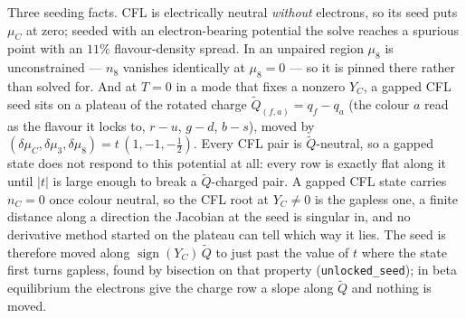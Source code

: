\documentclass[aps,prc,onecolumn,superscriptaddress,nofootinbib,10pt]{revtex4-2}
\newcommand{\muC}{\mu_C}
\begin{document}
Three seeding facts. CFL is electrically neutral \emph{without} electrons, so its
seed puts $\muC$ at zero; seeded with an electron-bearing potential the solve
reaches a spurious point with an $11\%$ flavour-density spread. In an
unpaired region $\mu_8$ is unconstrained --- $n_8$ vanishes identically at
$\mu_8 = 0$ --- so it is pinned there rather than solved for. And at $T = 0$ in
a mode that fixes a nonzero $Y_C$, a gapped CFL seed sits on a plateau of the
rotated charge $\tilde Q_{(f,a)} = q_f - q_a$ (the colour $a$ read as the flavour
it locks to, $r\!-\!u$, $g\!-\!d$, $b\!-\!s$), moved by
$(\delta\muC, \delta\mu_3, \delta\mu_8) = t\,(1, -1, -\tfrac12)$. Every CFL pair
is $\tilde Q$-neutral, so a gapped state does not respond to this potential at
all: every row is exactly flat along it until $|t|$ is large enough to break a
$\tilde Q$-charged pair. A gapped CFL state carries $n_C = 0$ once colour
neutral, so the CFL root at $Y_C \neq 0$ is the gapless one, a finite distance
along a direction the Jacobian at the seed is singular in, and no derivative
method started on the plateau can tell which way it lies. The seed is therefore
moved along $\operatorname{sign}(Y_C)\,\tilde Q$ to just past the value of $t$
where the state first turns gapless, found by bisection on that property
(\texttt{unlocked\_seed}); in beta equilibrium the electrons give the charge row
a slope along $\tilde Q$ and nothing is moved.
\end{document}
